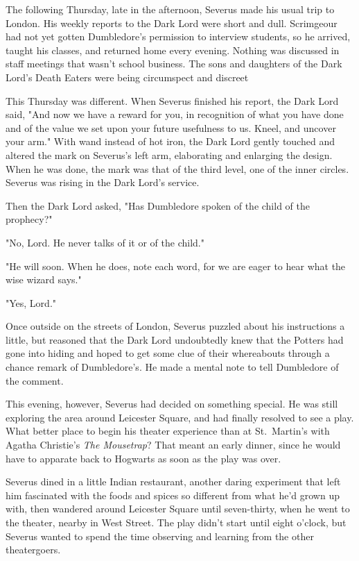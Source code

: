 The following Thursday, late in the afternoon, Severus made his usual trip to London. His weekly reports to the Dark Lord were short and dull. Scrimgeour had not yet gotten Dumbledore's permission to interview students, so he arrived, taught his classes, and returned home every evening. Nothing was discussed in staff meetings that wasn't school business. The sons and daughters of the Dark Lord's Death Eaters were being circumspect and discreet{\el}

This Thursday was different. When Severus finished his report, the Dark Lord said, "And now we have a reward for you, in recognition of what you have done and of the value we set upon your future usefulness to us. Kneel, and uncover your arm." With wand instead of hot iron, the Dark Lord gently touched and altered the mark on Severus's left arm, elaborating and enlarging the design. When he was done, the mark was that of the third level, one of the inner circles. Severus was rising in the Dark Lord's service.

Then the Dark Lord asked, "Has Dumbledore spoken of the child of the prophecy?"

"No, Lord. He never talks of it or of the child."

"He will soon. When he does, note each word, for we are eager to hear what the wise wizard says."

"Yes, Lord."

Once outside on the streets of London, Severus puzzled about his instructions a little, but reasoned that the Dark Lord undoubtedly knew that the Potters had gone into hiding and hoped to get some clue of their whereabouts through a chance remark of Dumbledore's. He made a mental note to tell Dumbledore of the comment.

This evening, however, Severus had decided on something special. He was still exploring the area around Leicester Square, and had finally resolved to see a play. What better place to begin his theater experience than at St.~Martin's with Agatha Christie's \emph{The Mousetrap}? That meant an early dinner, since he would have to apparate back to Hogwarts as soon as the play was over.

Severus dined in a little Indian restaurant, another daring experiment that left him fascinated with the foods and spices so different from what he'd grown up with, then wandered around Leicester Square until seven-thirty, when he went to the theater, nearby in West Street. The play didn't start until eight o'clock, but Severus wanted to spend the time observing and learning from the other theatergoers.

